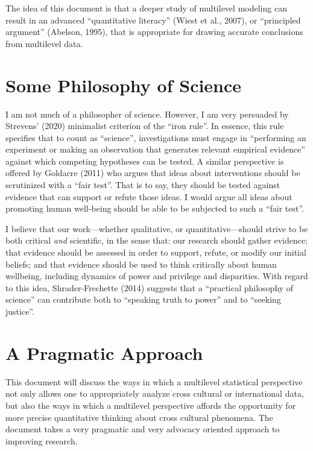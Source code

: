 \documentclass[
  letterpaper,
  DIV=11,
  numbers=noendperiod]{scrreprt}
\begin{document}
The idea of this document is that a deeper study of multilevel modeling
can result in an advanced ``quantitative literacy'' (Wiest et al.,
2007), or ``principled argument'' (Abelson, 1995), that is appropriate
for drawing accurate conclusions from multilevel data.

\hypertarget{some-philosophy-of-science}{%
\section{Some Philosophy of Science}\label{some-philosophy-of-science}}

I am not much of a philosopher of science. However, I am very persuaded
by Strevens' (2020) minimalist criterion of the ``iron rule''. In
essence, this rule specifies that to count as ``science'',
investigations must engage in ``performing an experiment or making an
observation that generates relevant empirical evidence'' against which
competing hypotheses can be tested. A similar perspective is offered by
Goldacre (2011) who argues that ideas about interventions should be
scrutinized with a ``fair test''. That is to say, they should be tested
against evidence that can support or refute those ideas. I would argue
all ideas about promoting human well-being should be able to be
subjected to such a ``fair test''.

I believe that our work---whether qualitative, or quantitative---should
strive to be both critical \emph{and} scientific, in the sense that: our
research should gather evidence; that evidence should be assessed in
order to support, refute, or modify our initial beliefs; and that
evidence should be used to think critically about human wellbeing,
including dynamics of power and privilege and disparities. With regard
to this idea, Shrader-Frechette (2014) suggests that a ``practical
philosophy of science'' can contribute both to ``speaking truth to
power'' and to ``seeking justice''.

\hypertarget{a-pragmatic-approach}{%
\section{A Pragmatic Approach}\label{a-pragmatic-approach}}

This document will discuss the ways in which a multilevel statistical
perspective not only allows one to appropriately analyze cross cultural
or international data, but also the ways in which a multilevel
perspective affords the opportunity for more precise quantitative
thinking about cross cultural phenomena. The document takes a very
pragmatic and very advocacy oriented approach to improving research.
\end{document}
